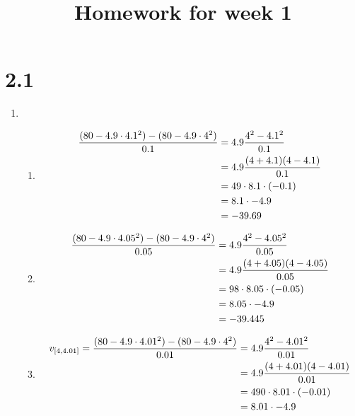 \documentclass{../../classes/anal}
\title{Homework for week 1}
\begin{document}
    \maketitle

    \section*{2.1}

    \begin{problem}{5}
        \begin{enumerate}[label={(\alph*)}]
            \item \begin{enumerate}[label={(\roman*)}]
                \item \begin{align*}
                    \frac{(80 - 4.9 \cdot 4.1^2) - (80 - 4.9 \cdot 4^2)}{0.1}
                    &= 4.9{4^2 - 4.1^2 \over 0.1} \\
                    &= 4.9{(4+4.1)(4-4.1) \over 0.1} \\
                    &= 49 \cdot 8.1 \cdot (-0.1) \\
                    &= 8.1 \cdot -4.9 \\
                    &= -39.69
                \end{align*}
                \item \begin{align*}
                    \frac{(80 - 4.9 \cdot 4.05^2) - (80 - 4.9 \cdot 4^2)}{0.05}
                    &= 4.9{4^2 - 4.05^2 \over 0.05} \\
                    &= 4.9{(4+4.05)(4-4.05) \over 0.05} \\
                    &= 98 \cdot 8.05 \cdot (-0.05) \\
                    &= 8.05 \cdot -4.9 \\
                    &= -39.445
                \end{align*}
                \item \begin{align*}
                    v_{[4, 4.01]}=
                    \frac{(80 - 4.9 \cdot 4.01^2) - (80 - 4.9 \cdot 4^2)}{0.01}
                    &= 4.9{4^2 - 4.01^2 \over 0.01} \\
                    &= 4.9{(4+4.01)(4-4.01) \over 0.01} \\
                    &= 490 \cdot 8.01 \cdot (-0.01) \\
                    &= 8.01 \cdot -4.9 \\

\end{align*}
\end{enumerate}
\end{enumerate}
\end{problem}
\end{document}
